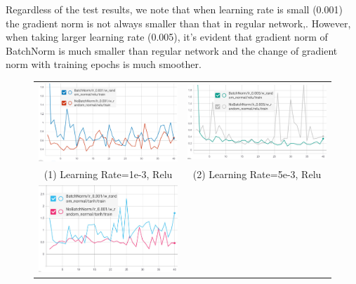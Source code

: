 \documentclass{article}
\begin{document}
Regardless of the test results, we note that  when learning rate is small (0.001) the gradient norm is not always smaller than that in regular network,. However, when taking larger learning rate (0.005), it's evident that gradient norm of BatchNorm is much smaller than regular network and the change of gradient norm with training epochs is much smoother.


\begin{figure}[h]
\begin{tabular}{cc}
  \includegraphics[scale=0.28]{pics/batchNorm/BatchNorm_relu_1.jpg} &
  \includegraphics[scale=0.32]{pics/batchNorm/BatchNorm_relu_5.jpg}
  \\
  (1) Learning Rate=1e-3, Relu & (2) Learning Rate=5e-3, Relu\\[6pt]
  \includegraphics[scale=0.3]{pics/batchNorm/BatchNorm_tanh_1.jpg} &

\end{tabular}
\end{figure}
\end{document}
